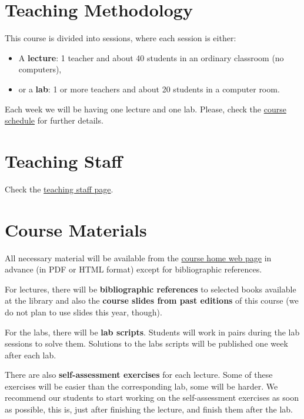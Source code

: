 \documentclass[11pt, a4paper, twoside]{article}
\begin{document}
\section{Teaching Methodology}

This course is divided into sessions, where each session is either:

\begin{itemize}

  \item A \textbf{lecture}: 1 teacher and about 40 students in an ordinary
    classroom (no computers),

  \item or a \textbf{lab}: 1 or more teachers and about 20 students in a
    computer room.

\end{itemize}

Each week we will be having one lecture and one lab. Please, check the
\href{http://www.it.uc3m.es/alcortes/asig/1415/ps-ging/schedule.pdf}{course
schedule} for further details.

\section{Teaching Staff}

Check the
\href{http://it.uc3m.es/alcortes/asig/1415/ps-ging/staff.html}{teaching staff page}.

\section{Course Materials}

All necessary material will be available from the
\href{http://it.uc3m.es/alcortes/asig/1415/ps-ging/}{course home web page} in
advance (in PDF or HTML format) except for bibliographic references.

For lectures, there will be \textbf{bibliographic references} to selected
books available at the library and also the \textbf{course slides
from past editions} of this course (we do not plan to use slides this year,
though).

For the labs, there will be \textbf{lab scripts}. Students will work in
pairs during the lab sessions to solve them. Solutions to the labs scripts
will be published one week after each lab.

There are also \textbf{self-assessment exercises} for each lecture. Some of
these exercises will be easier than the corresponding lab, some will be
harder. We recommend our students to start working on the self-assessment
exercises as soon as possible, this is, just after finishing the lecture, and
finish them after the lab.
\end{document}
